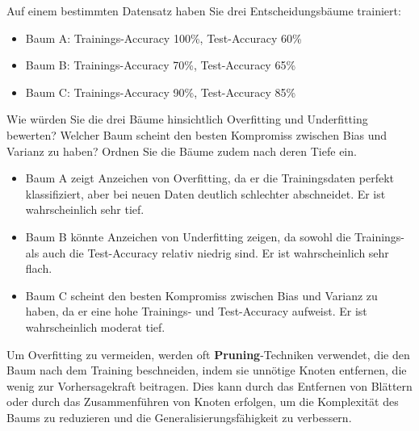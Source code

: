 \begin{myexercise}
    Auf einem bestimmten Datensatz haben Sie drei Entscheidungsbäume trainiert:
    \begin{itemize}
        \item Baum A: Trainings-Accuracy 100\%, Test-Accuracy 60\%
        \item Baum B: Trainings-Accuracy 70\%, Test-Accuracy 65\%
        \item Baum C: Trainings-Accuracy 90\%, Test-Accuracy 85\%
    \end{itemize}
    Wie würden Sie die drei Bäume hinsichtlich Overfitting und Underfitting bewerten? Welcher Baum scheint den besten Kompromiss zwischen Bias und Varianz zu haben? Ordnen Sie die Bäume zudem nach deren Tiefe ein.
    \begin{myanswer}
        \begin{itemize}
            \item Baum A zeigt Anzeichen von Overfitting, da er die Trainingsdaten perfekt klassifiziert, aber bei neuen Daten deutlich schlechter abschneidet. Er ist wahrscheinlich sehr tief.
            \item Baum B könnte Anzeichen von Underfitting zeigen, da sowohl die Trainings- als auch die Test-Accuracy relativ niedrig sind. Er ist wahrscheinlich sehr flach.
            \item Baum C scheint den besten Kompromiss zwischen Bias und Varianz zu haben, da er eine hohe Trainings- und Test-Accuracy aufweist. Er ist wahrscheinlich moderat tief.
        \end{itemize}
    \end{myanswer}
\end{myexercise}

\begin{mydefinition}
    Um Overfitting zu vermeiden, werden oft \textbf{Pruning}-Techniken verwendet, die den Baum nach dem Training beschneiden, indem sie unnötige Knoten entfernen, die wenig zur Vorhersagekraft beitragen. Dies kann durch das Entfernen von Blättern oder durch das Zusammenführen von Knoten erfolgen, um die Komplexität des Baums zu reduzieren und die Generalisierungsfähigkeit zu verbessern.
\end{mydefinition}

